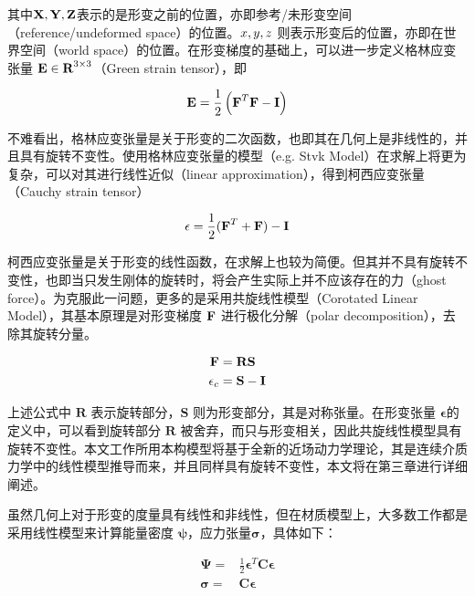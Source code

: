 其中$\textbf{X}, \textbf{Y}, \textbf{Z}$表示的是形变之前的位置，亦即参考/未形变空间（reference/undeformed space）的位置。$\boldmath{x}, \boldmath{y}, \boldmath{z}$ 则表示形变后的位置，亦即在世界空间（world space）的位置。在形变梯度的基础上，可以进一步定义格林应变张量 $\textbf{E} \in \textbf{R}^{3\times3}$（Green strain tensor），即

\begin{equation}
\textbf{E} = \frac{1}{2}\left(\textbf{F}^{T}\textbf{F} - \textbf{I}\right)
\end{equation}

不难看出，格林应变张量是关于形变的二次函数，也即其在几何上是非线性的，并且具有旋转不变性。使用格林应变张量的模型（e.g. Stvk Model）在求解上将更为复杂，可以对其进行线性近似（linear approximation），得到柯西应变张量（Cauchy strain tensor）

\begin{equation}
\mathbf{\epsilon} = \frac{1}{2}(\textbf{F}^T + \textbf{F}) - \textbf{I}
\end{equation}

柯西应变张量是关于形变的线性函数，在求解上也较为简便。但其并不具有旋转不变性，也即当只发生刚体的旋转时，将会产生实际上并不应该存在的力（ghost force）。为克服此一问题，更多的是采用共旋线性模型（Corotated Linear Model），其基本原理是对形变梯度 $\textbf{F}$ 进行极化分解（polar decomposition），去除其旋转分量。

\begin{equation}
\begin{aligned}
\textbf{F} & = \textbf{RS} \\
\mathbf{\epsilon}_c & = \textbf{S} - \textbf{I}
\end{aligned}
\end{equation}

上述公式中 $\textbf{R}$ 表示旋转部分，$\textbf{S}$ 则为形变部分，其是对称张量。在形变张量 $\mathbf{\epsilon}$的定义中，可以看到旋转部分 $\textbf{R}$ 被舍弃，而只与形变相关，因此共旋线性模型具有旋转不变性。本文工作所用本构模型将基于全新的近场动力学理论，其是连续介质力学中的线性模型推导而来，并且同样具有旋转不变性，本文将在第三章进行详细阐述。

虽然几何上对于形变的度量具有线性和非线性，但在材质模型上，大多数工作都是采用线性模型来计算能量密度 $\mathbf{\psi} $，应力张量$\mathbf{\sigma}$，具体如下：

\begin{equation}
\begin{aligned}
\mathbf{\Psi} = &\frac{1}{2}\mathbf{\epsilon}^T\textbf{C}\mathbf{\epsilon}\\
\mathbf{\sigma} = &\textbf{C}\mathbf{\epsilon}
\end{aligned}
\end{equation}

